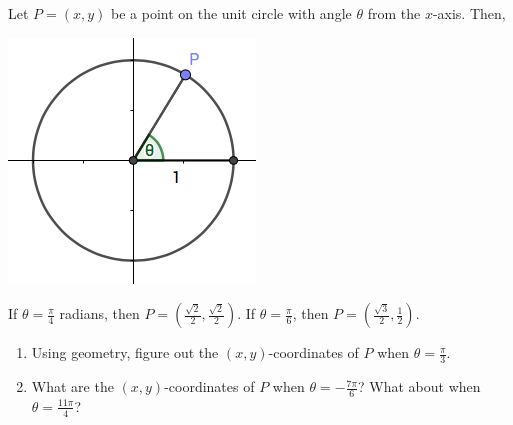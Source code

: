 \documentclass[12pt, a4paper]{article}
\begin{document}
\hspace{-0.25in}\begin{minipage}{0.8\linewidth}
\begin{thrm}
  Let \(P=(x,y)\) be a point on the unit circle with angle \(\theta\)
  from the \(x\)-axis. Then, \\
\end{thrm}  
\end{minipage}
\begin{minipage}{0.2\linewidth}
  \includegraphics[scale=0.5]{images/unit-circle}
\end{minipage}
\begin{ex}
  If \(\theta = \frac{\pi}{4}\) radians, then \(P = \left(\frac{\sqrt{2}}{2},
  \frac{\sqrt{2}}{2}\right)\). If \(\theta = \frac{\pi}{6}\), then \(P =
  \left(\frac{\sqrt{3}}{2}, \frac{1}{2}\right)\).
  \begin{enumerate}
  \item Using geometry, figure out the \((x,y)\)-coordinates of \(P\)
    when \(\theta = \frac{\pi}{3}\).
  \vspace{1in}
  \item What are the \((x,y)\)-coordinates of \(P\) when \(\theta =
    -\frac{7\pi}{6}\)? What about when \(\theta = \frac{11 \pi}{4}\)?
  \vspace{1in}
  \end{enumerate}
\end{ex}
\vspace{-1.5in}
\end{document}
